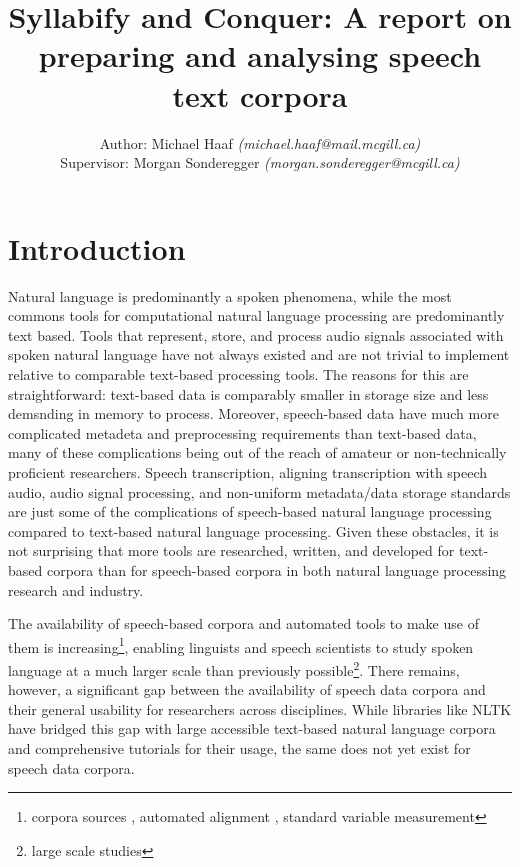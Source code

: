 \documentclass[11pt]{article}
\begin{document}
\title{Syllabify and Conquer: A report on preparing and analysing speech text corpora}
\author{Author: Michael Haaf \textit{(michael.haaf@mail.mcgill.ca)} \\ Supervisor: Morgan Sonderegger \textit{(morgan.sonderegger@mcgill.ca)}}

\maketitle
\begin{singlespace}
\tableofcontents
\end{singlespace}
\newpage

\section{Introduction}

\nocite{*}

Natural language is predominantly a spoken phenomena, while the most commons tools for computational natural language processing are predominantly text based. Tools that represent, store, and process audio signals associated with spoken natural language have not always existed and are not trivial to implement relative to comparable text-based processing tools. The reasons for this are straightforward: text-based data is comparably smaller in storage size and less demsnding in memory to process. Moreover, speech-based data have much more complicated metadeta and preprocessing requirements than text-based data, many of these complications being out of the reach of amateur or non-technically proficient researchers. Speech transcription, aligning transcription with speech audio, audio signal processing, and non-uniform metadata/data storage standards are just some of the complications of speech-based natural language processing compared to text-based natural language processing. Given these obstacles, it is not surprising that more tools are researched, written, and developed for text-based corpora than for speech-based corpora in both natural language processing research and industry.

The availability of speech-based corpora and automated tools to make use of them is increasing\footnote{corpora sources , automated alignment , standard variable measurement }, enabling linguists and speech scientists to study spoken language at a much larger scale than previously possible\footnote{large scale studies}. There remains, however, a significant gap between the availability of speech data corpora and their general usability for researchers across disciplines. While libraries like NLTK\cite{noauthor_nltk_nodate} have bridged this gap with large accessible text-based natural language corpora and comprehensive tutorials for their usage, the same does not yet exist for speech data corpora.
\end{document}
